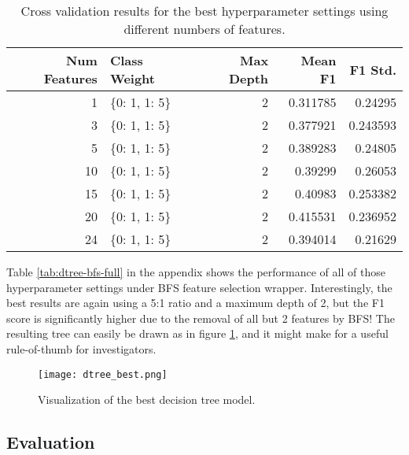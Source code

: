 \documentclass{article}
\begin{document}
\begin{table}[H]
\centering
\caption{Cross validation results for the best hyperparameter settings using different numbers of features.}
\label{tab:dtree-builtin-summ}
\begin{tabular}{rlrrr}
\hline
   Num Features & Class Weight   &   Max Depth &   Mean F1 &   F1 Std. \\
\hline
              1 & \{0: 1, 1: 5\}   &           2 &  0.311785 &  0.24295  \\
              3 & \{0: 1, 1: 5\}   &           2 &  0.377921 &  0.243593 \\
              5 & \{0: 1, 1: 5\}   &           2 &  0.389283 &  0.24805  \\
             10 & \{0: 1, 1: 5\}   &           2 &  0.39299  &  0.26053  \\
             15 & \{0: 1, 1: 5\}   &           2 &  0.40983  &  0.253382 \\
             20 & \{0: 1, 1: 5\}   &           2 &  0.415531 &  0.236952 \\
             24 & \{0: 1, 1: 5\}   &           2 &  0.394014 &  0.21629  \\
\hline
\end{tabular}
\end{table}

Table \ref{tab:dtree-bfs-full} in the appendix shows the performance of all of those hyperparameter settings under BFS feature selection wrapper. Interestingly, the best results are again using a 5:1 ratio and a maximum depth of 2, but the F1 score is significantly higher due to the removal of all but 2 features by BFS! The resulting tree can easily be drawn as in figure \ref{fig:best-dtree}, and it might make for a useful rule-of-thumb for investigators.

\begin{figure}[H]
    \centering
    \texttt{[image: dtree\_best.png]}
    \caption{Visualization of the best decision tree model.}%
    \label{fig:best-dtree}%
\end{figure}

\subsection{Evaluation}
\end{document}
